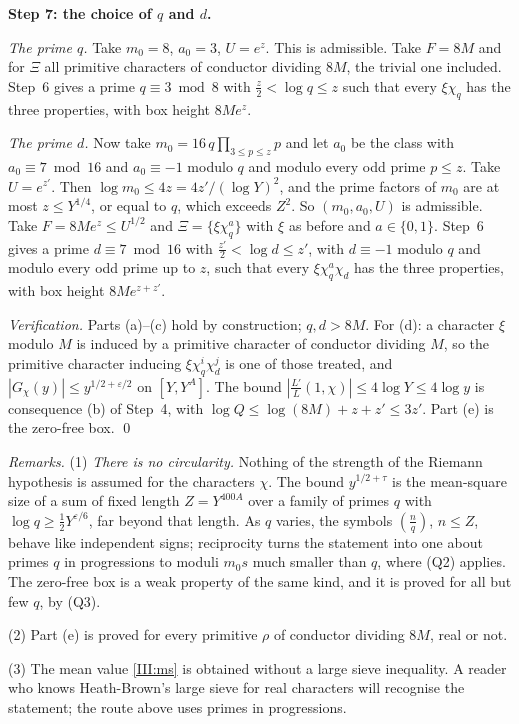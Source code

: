 \documentclass[11pt,letterpaper]{article}
\begin{document}
\textbf{Step 7: the choice of $q$ and $d$.}

\emph{The prime $q$.} Take $m_0=8$, $a_0=3$, $U=e^z$. This is admissible. Take $F=8M$ and for $\Xi$ all
primitive characters of conductor dividing $8M$, the trivial one included. Step~6 gives a prime
$q\equiv3\bmod8$ with $\frac z2<\log q\le z$ such that every $\xi\chi_q$ has the three properties, with box
height $8Me^z$.

\emph{The prime $d$.} Now take $m_0=16\,q\prod_{3\le p\le z}p$ and let $a_0$ be the class with
$a_0\equiv7\bmod16$ and $a_0\equiv-1$ modulo $q$ and modulo every odd prime $p\le z$. Take $U=e^{z'}$. Then
$\log m_0\le4z=4z'/(\log Y)^2$, and the prime factors of $m_0$ are at most $z\le Y^{1/4}$, or equal to $q$,
which exceeds $Z^2$. So $(m_0,a_0,U)$ is admissible. Take $F=8Me^z\le U^{1/2}$ and
$\Xi=\{\xi\chi_q^a\}$ with $\xi$ as before and $a\in\{0,1\}$. Step~6 gives a prime $d\equiv7\bmod16$ with
$\frac{z'}2<\log d\le z'$, with $d\equiv-1$ modulo $q$ and modulo every odd prime up to $z$, such that every
$\xi\chi_q^a\chi_d$ has the three properties, with box height $8Me^{z+z'}$.

\emph{Verification.} Parts (a)--(c) hold by construction; $q,d>8M$. For (d): a character $\xi$ modulo $M$ is
induced by a primitive character of conductor dividing $M$, so the primitive character inducing
$\xi\chi_q^i\chi_d^j$ is one of those treated, and $|G_\chi(y)|\le y^{1/2+\varepsilon/2}$ on $[Y,Y^A]$. The
bound $|\frac{L'}L(1,\chi)|\le4\log Y\le4\log y$ is consequence (b) of Step~4, with
$\log Q\le\log(8M)+z+z'\le3z'$. Part (e) is the zero-free box. \qed

\emph{Remarks.} (1) \emph{There is no circularity.} Nothing of the strength of the Riemann hypothesis is
assumed for the characters $\chi$. The bound $y^{1/2+\tau}$ is the mean-square size of a sum of fixed length
$Z=Y^{400A}$ over a family of primes $q$ with $\log q\ge\frac12Y^{\varepsilon/6}$, far beyond that length. As
$q$ varies, the symbols $(\frac nq)$, $n\le Z$, behave like independent signs; reciprocity turns the
statement into one about primes $q$ in progressions to moduli $m_0s$ much smaller than $q$, where (Q2)
applies. The zero-free box is a weak property of the same kind, and it is proved for all but few $q$, by
(Q3).

(2) Part (e) is proved for every primitive $\rho$ of conductor dividing $8M$, real or not.

(3) The mean value \eqref{III:ms} is obtained without a large sieve inequality. A reader who knows
Heath-Brown's large sieve for real characters \cite{HB95} will recognise the statement; the route above
uses primes in progressions.
\end{document}
